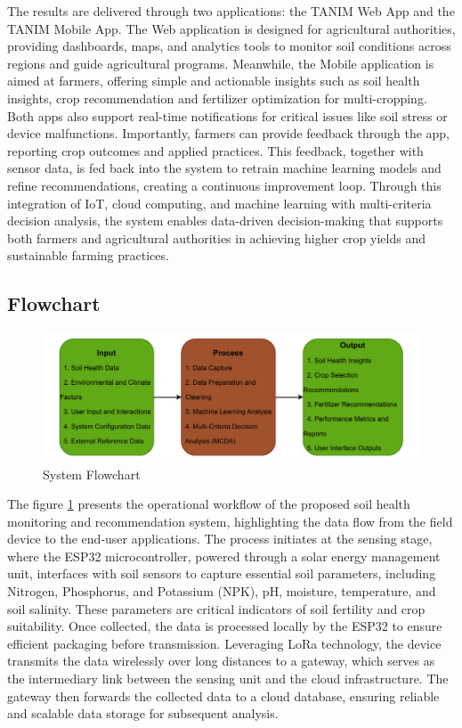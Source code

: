 {	The results are delivered through two applications: the TANIM Web App and the TANIM Mobile App. The Web application is designed for agricultural authorities, providing dashboards, maps, and analytics tools to monitor soil conditions across regions and guide agricultural programs. Meanwhile, the Mobile application is aimed at farmers, offering simple and actionable insights such as soil health insights, crop recommendation and fertilizer optimization for multi-cropping. Both apps also support real-time notifications for critical issues like soil stress or device malfunctions. Importantly, farmers can provide feedback through the app, reporting crop outcomes and applied practices. This feedback, together with sensor data, is fed back into the system to retrain machine learning models and refine recommendations, creating a continuous improvement loop. Through this integration of IoT, cloud computing, and machine learning with multi-criteria decision analysis, the system enables data-driven decision-making that supports both farmers and agricultural authorities in achieving higher crop yields and sustainable farming practices.
	
	\subsection{Flowchart}
	
	\begin{figure}[H]
		\centering
		\caption{System Flowchart}
		\label{fig:SystemFlowchart}
		\includegraphics[width=1\textwidth]{figures/IPO.pdf}
	\end{figure}
	
	The figure \ref{fig:SystemFlowchart} presents the operational workflow of the proposed soil health monitoring and recommendation system, highlighting the data flow from the field device to the end-user applications. The process initiates at the sensing stage, where the ESP32 microcontroller, powered through a solar energy management unit, interfaces with soil sensors to capture essential soil parameters, including Nitrogen, Phosphorus, and Potassium (NPK), pH, moisture, temperature, and soil salinity. These parameters are critical indicators of soil fertility and crop suitability. Once collected, the data is processed locally by the ESP32 to ensure efficient packaging before transmission. Leveraging LoRa technology, the device transmits the data wirelessly over long distances to a gateway, which serves as the intermediary link between the sensing unit and the cloud infrastructure. The gateway then forwards the collected data to a cloud database, ensuring reliable and scalable data storage for subsequent analysis.
	
}
